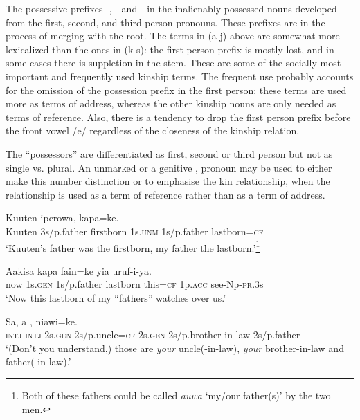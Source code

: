 The possessive prefixes -, - and - in the inalienably possessed nouns developed from the first, second, and third person pronouns. These prefixes are in the process of merging with the root. The terms in (a-j) above are somewhat more lexicalized than the ones in (k-s): the first person prefix is mostly lost, and in some cases there is suppletion in the stem. These are some of the socially most important and frequently used kinship terms. The frequent use probably accounts for the omission of the possession prefix in the first person: these terms are used more as terms of address, whereas the other kinship nouns are only needed as terms of reference. Also, there is a tendency to drop the first person prefix before the front vowel /e/ regardless of the closeness of the kinship relation.

The ``possessors'' are differentiated as first, second or third person but not as single vs. plural. An unmarked  or a genitive ,  pronoun may be used to either make this number distinction or to emphasise the kin relationship, when the relationship is used as a term of reference rather than as a term of address.

\ea%
\label{ex:3:x1311}
\gll Kuuten  iperowa,   kapa=ke. \\
Kuuten 3s/p.father firstborn 1s.\textsc{unm} 1s/p.father lastborn=\textsc{cf}\\
\glt`Kuuten's father was the firstborn, my father the lastborn.'\footnote{Both of these fathers could be called \textit{auwa} `my/our father(s)' by the two men.}
\z

\ea%
\label{ex:3:x28}
\gll Aakisa    kapa fain=ke yia uruf-i-ya. \\
now 1s.\textsc{gen} 1s/p.father lastborn this=\textsc{cf} 1p.\textsc{acc} see-Np-\textsc{pr}.3s\\
\glt`Now this lastborn of my ``fathers'' watches over us.'
\z

\ea%
\label{ex:3:x1312}
\gll Sa, a  ,   niawi=ke.\\
\textsc{intj} \textsc{intj} 2s.\textsc{gen} 2s/p.uncle=\textsc{cf} 2s.\textsc{gen} 2s/p.brother-in-law 2s/p.father\\
\glt`(Don't you understand,) those are \textit{your} uncle(-in-law), \textit{your} brother-in-law and father(-in-law).'
\z

